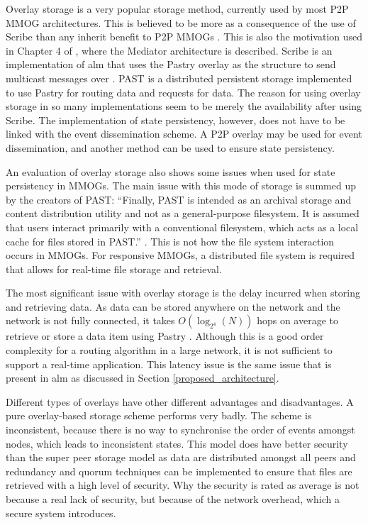 \documentclass[journal,oneside,a4paper,onecolumn]{IEEEtran}
\begin{document}
Overlay storage is a very popular storage method, currently used by most P2P MMOG architectures. This is believed to be more as a consequence of the use of Scribe than any inherit benefit to P2P MMOGs \cite{past_storage_focus}. This is also the motivation used in Chapter 4 of \cite{Fan_phd}, where the Mediator architecture is described. Scribe is an implementation of \ac{alm} that uses the Pastry overlay as the structure to send multicast messages over \cite{scribe}. PAST is a distributed persistent storage implemented to use Pastry for routing data and requests for data. The reason for using overlay storage in so many implementations seem to be merely the availability after using Scribe. The implementation of state persistency, however, does not have to be linked with the event dissemination scheme. A P2P overlay may be used for event dissemination, and another method can be used to ensure state persistency.

An evaluation of overlay storage also shows some issues when used for state persistency in MMOGs. The main issue with this mode of storage is summed up by the creators of PAST: ``Finally, PAST is intended as an archival storage and content distribution utility and not as a general-purpose filesystem. It is assumed that users interact primarily with a conventional filesystem, which acts as a local cache for files stored in PAST.'' \cite{storage_and_chaching_PAST}. This is not how the file system interaction occurs in MMOGs. For responsive MMOGs, a distributed file system is required that allows for real-time file storage and retrieval.

The most significant issue with overlay storage is the delay incurred when storing and retrieving data. As data can be stored anywhere on the network and the network is not fully connected, it takes $O(\log_{2^4}(N))$ hops on average to retrieve or store a data item using Pastry \cite{storage_and_chaching_PAST}. Although this is a good order complexity for a routing algorithm in a large network, it is not sufficient to support a real-time application. This latency issue is the same issue that is present in \ac{alm} as discussed in Section \ref{proposed_architecture}.

Different types of overlays have other different advantages and disadvantages. A pure overlay-based storage scheme performs very badly. The scheme is inconsistent, because there is no way to synchronise the order of events amongst nodes, which leads to inconsistent states. This model does have better security than the super peer storage model as data are distributed amongst all peers and redundancy and quorum techniques can be implemented to ensure that files are retrieved with a high level of security. Why the security is rated as average is not because a real lack of security, but because of the network overhead, which a secure system introduces.
\end{document}
